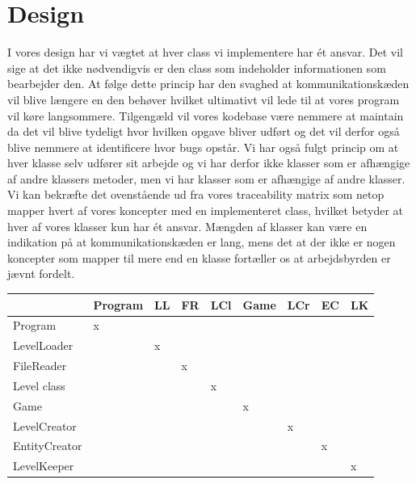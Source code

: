 \section{Design}
I vores design har vi vægtet at hver class vi implementere har ét ansvar. Det vil sige at det ikke nødvendigvis er den class som indeholder informationen som bearbejder den. At følge dette princip har den svaghed at kommunikationskæden vil blive længere en den behøver hvilket ultimativt vil lede til at vores program vil køre langsommere. Tilgengæld vil vores kodebase være nemmere at maintain da det vil blive tydeligt hvor hvilken opgave bliver udført og det vil derfor også blive nemmere at identificere hvor bugs opstår. Vi har også fulgt princip om at hver klasse selv udfører sit arbejde og vi har derfor ikke klasser som er afhængige af andre klassers metoder, men vi har klasser som er afhængige af andre klasser.\\
Vi kan bekræfte det ovenstående ud fra vores traceability matrix som netop mapper hvert af vores koncepter med en implementeret class, hvilket betyder at hver af vores klasser kun har ét ansvar. Mængden af klasser kan være en indikation på at kommunikationskæden er lang, mens det at der ikke er nogen koncepter som mapper til mere end en klasse fortæller os at arbejdsbyrden er jævnt fordelt.\\

\begin{table}[h!]
\centering
\label{my-label}
\begin{tabular}{|l|l|l|l|l|l|l|l|l|}
\hline
              & Program & LL & FR & LCl & Game & LCr & EC & LK \\\hline
Program       & x       &             &            &       &      &              &               &             \\\hline
LevelLoader   &         & x           &            &       &      &              &               &             \\\hline
FileReader    &         &             & x          &       &      &              &               &             \\\hline
Level class        &         &             &            & x     &      &              &               &             \\\hline
Game          &         &             &            &       & x    &              &               &             \\\hline
LevelCreator  &         &             &            &       &      & x            &               &             \\\hline
EntityCreator &         &             &            &       &      &              & x             &             \\\hline
LevelKeeper   &         &             &            &       &      &              &               & x\\\hline
\end{tabular}
\end{table}

